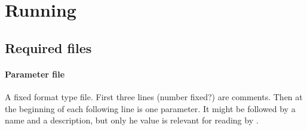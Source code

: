 \section{Running \neort}

\subsection{Required files}

\paragraph{Parameter file}
A fixed format type file. First three lines (number fixed?) are
comments. Then at the beginning of each following line is one parameter.
It might be followed by a name and a description, but only he value is
relevant for reading by \neort.

